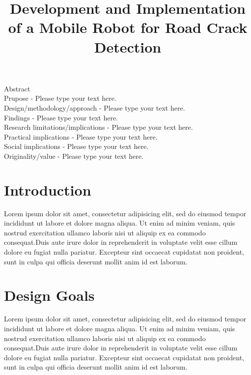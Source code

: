 \documentclass[twocolumn]{article}
\title{Development and Implementation of a Mobile Robot for Road Crack Detection}
\date{}
\begin{document}
\maketitle
    \begin{strip}
        Abstract\\
        Prupose - Please type your text here.\\
        Design/methodology/approach - Please type your text here.\\
        Findings - Please type your text here.\\
        Research limitations/implications - Please type your text here.\\
        Practical implications - Please type your text here.\\
        Social implications - Please type your text here.\\
        Originality/value - Please type your text here.\\
    \end{strip}
    
    \section{Introduction}
        Lorem ipsum dolor sit amet, consectetur adipisicing elit, sed do eiusmod
        tempor incididunt ut labore et dolore magna aliqua. Ut enim ad minim veniam,
        quis nostrud exercitation ullamco laboris nisi ut aliquip ex ea commodo
        consequat.Duis aute irure dolor in reprehenderit in voluptate velit esse
        cillum dolore eu fugiat nulla pariatur. Excepteur sint occaecat cupidatat non
        proident, \cite{GraffZivin2018} sunt in culpa qui officia deserunt mollit anim id est laborum.

    \section{Design Goals}
        Lorem ipsum dolor sit amet, consectetur adipisicing elit, sed do eiusmod
        tempor incididunt ut labore et dolore magna aliqua. Ut enim ad minim veniam,
        quis nostrud exercitation ullamco laboris nisi ut aliquip ex ea commodo
        consequat.Duis aute irure dolor in reprehenderit in voluptate velit esse
        cillum dolore eu fugiat nulla pariatur. Excepteur sint occaecat cupidatat non
        proident, sunt in culpa qui officia deserunt mollit anim id est laborum.
    
\end{document}
